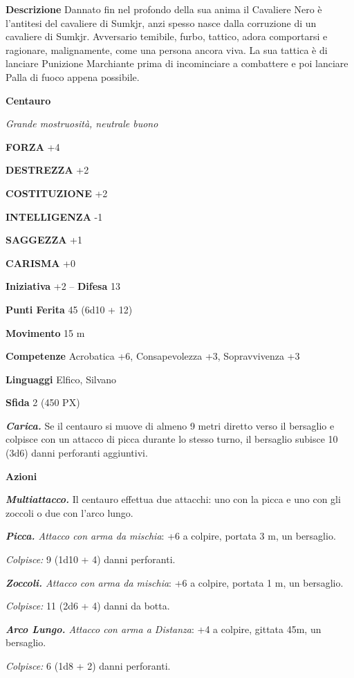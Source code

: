 \begin{multicols}{2}
\textbf{Descrizione}
Dannato fin nel profondo della sua anima il Cavaliere Nero è l'antitesi del cavaliere di Sumkjr, anzi spesso nasce dalla corruzione di un cavaliere di Sumkjr. Avversario temibile, furbo, tattico, adora comportarsi e ragionare, malignamente, come una persona ancora viva. La sua tattica è di lanciare Punizione Marchiante prima di incominciare a combattere e poi lanciare Palla di fuoco appena possibile.

\medskip{}\textbf{Centauro}

\textit{Grande mostruosità, neutrale buono}

\textbf{FORZA} +4

\textbf{DESTREZZA} +2

\textbf{COSTITUZIONE} +2

\textbf{INTELLIGENZA} -1

\textbf{SAGGEZZA} +1

\textbf{CARISMA} +0

\textbf{Iniziativa} +2 -- \textbf{Difesa} 13

\textbf{Punti Ferita} 45 (6d10 + 12)

\textbf{Movimento} 15 m

\textbf{Competenze} Acrobatica +6, Consapevolezza +3, Sopravvivenza +3

\textbf{Linguaggi} Elfico, Silvano

\textbf{Sfida} 2 (450 PX)

\textit{\textbf{Carica.}} Se il centauro si muove di almeno 9 metri diretto verso il bersaglio e colpisce con un attacco di picca durante lo stesso turno, il bersaglio subisce 10 (3d6) danni perforanti aggiuntivi.

\textbf{Azioni}

\textit{\textbf{Multiattacco.}} Il centauro effettua due attacchi: uno con la picca e uno con gli zoccoli o due con l'arco lungo.

\textit{\textbf{Picca.} Attacco con arma da mischia}: +6 a colpire, portata 3 m, un bersaglio.

\textit{Colpisce:} 9 (1d10 + 4) danni perforanti.

\textit{\textbf{Zoccoli.} Attacco con arma da mischia}: +6 a colpire, portata 1 m, un bersaglio.

\textit{Colpisce:} 11 (2d6 + 4) danni da botta.

\textit{\textbf{Arco Lungo.} Attacco con arma a Distanza}: +4 a colpire, gittata 45m, un bersaglio.

\textit{Colpisce:} 6 (1d8 + 2) danni perforanti.


\end{multicols}
